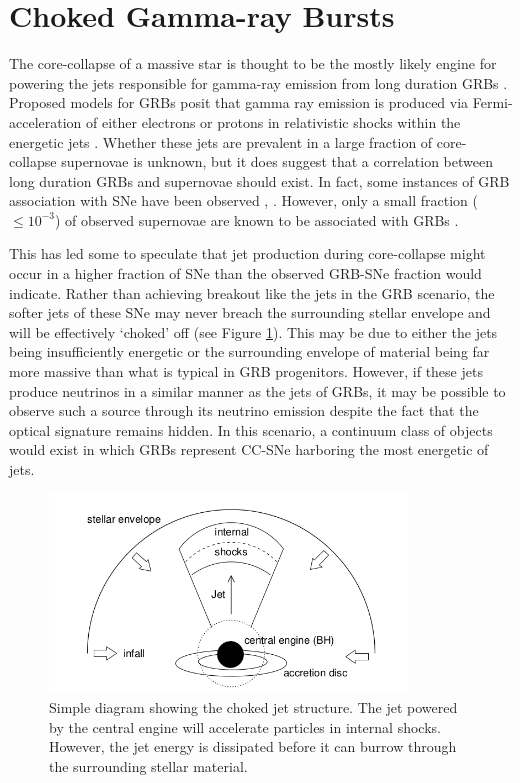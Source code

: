\documentclass{gatech-thesis}
\begin{document}
\section{Choked Gamma-ray Bursts}
The core-collapse of a massive star is thought to be the mostly likely engine for powering the jets responsible for gamma-ray emission from long duration GRBs \cite{2004RvMP...76.1143P}. Proposed models for GRBs posit that gamma ray emission is produced via Fermi-acceleration of either electrons or protons in relativistic shocks within the energetic jets \cite{2004IJMPA..19.2385Z}. Whether these jets are prevalent in a large fraction of core-collapse supernovae is unknown, but it does suggest that a correlation between long duration GRBs and supernovae should exist. In fact, some instances of GRB association with SNe have been observed \cite{2006ARA&A..44..507W}, \cite{2011AN....332..434M} \cite{2003astro.ph..1006H}. However, only a small fraction ($\leq 10^{-3}$) of observed supernovae are known to be associated with GRBs \cite{2003ApJ...599..408B}. 

This has led some to speculate that jet production during core-collapse might occur in a higher fraction of SNe than the observed GRB-SNe fraction would indicate. Rather than achieving breakout like the jets in the GRB scenario, the softer jets of these SNe may never breach the surrounding stellar envelope and will be effectively `choked' off (see Figure \ref{fig:chokedjet}). This may be due to either the jets being insufficiently energetic or the surrounding envelope of material being far more massive than what is typical in GRB progenitors. However, if these jets produce neutrinos in a similar manner as the jets of GRBs, it may be possible to observe such a source through its neutrino emission despite the fact that the optical signature remains hidden. In this scenario, a continuum class of objects would exist in which GRBs represent CC-SNe harboring the most energetic of jets.

\begin{figure}[ht]
  \begin{center}
    \includegraphics[width=0.85\textwidth,keepaspectratio]{ChokedJet.png}
  \end{center}
  \caption[Choked GRB Jet Diagram]{Simple diagram showing the choked jet structure. The jet powered by the central engine will accelerate particles in internal shocks. However, the jet energy is dissipated before it can burrow through the surrounding stellar material.}
  \label{fig:chokedjet}
\end{figure}
\end{document}
